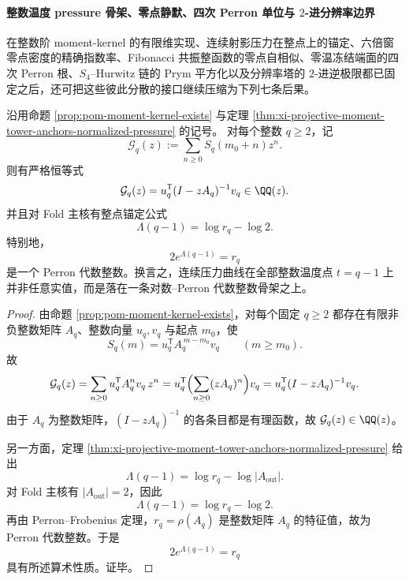 \paragraph{整数温度 pressure 骨架、零点静默、四次 Perron 单位与 \(2\)-进分辨率边界}
在整数阶 moment-kernel 的有限维实现、连续射影压力在整点上的锚定、六倍窗零点密度的精确指数率、Fibonacci 共振整函数的零点自相似、零温冻结端面的四次 Perron 根、\(S_4\)--Hurwitz 链的 Prym 平方化以及分辨率塔的 \(2\)-进逆极限都已固定之后，还可把这些彼此分散的接口继续压缩为下列七条后果。

\begin{theorem}[整数温度样本构成连续压力曲线的代数骨架]\label{thm:xi-time-part9zo-integer-temperature-pressure-algebraic-skeleton}
沿用命题 \ref{prop:pom-moment-kernel-exists} 与定理 \ref{thm:xi-projective-moment-tower-anchors-normalized-pressure} 的记号。
对每个整数 \(q\ge 2\)，记
\[
\mathcal G_q(z):=\sum_{n\ge 0}S_q(m_0+n)z^n.
\]
则有严格恒等式
\[
\mathcal G_q(z)=u_q^{\mathsf T}(I-zA_q)^{-1}v_q\in \QQ(z).
\]
并且对 Fold 主核有整点锚定公式
\[
\Lambda(q-1)=\log r_q-\log 2.
\]
特别地，
\[
2e^{\Lambda(q-1)}=r_q
\]
是一个 Perron 代数整数。换言之，连续压力曲线在全部整数温度点 \(t=q-1\) 上并非任意实值，而是落在一条对数--Perron 代数整数骨架之上。
\end{theorem}
\begin{proof}
由命题 \ref{prop:pom-moment-kernel-exists}，对每个固定 \(q\ge 2\) 都存在有限非负整数矩阵 \(A_q\)、整数向量 \(u_q,v_q\) 与起点 \(m_0\)，使
\[
S_q(m)=u_q^{\mathsf T}A_q^{\,m-m_0}v_q
\qquad (m\ge m_0).
\]
故
\[
\mathcal G_q(z)
=
\sum_{n\ge 0}u_q^{\mathsf T}A_q^n v_q\,z^n
=
u_q^{\mathsf T}\Bigl(\sum_{n\ge 0}(zA_q)^n\Bigr)v_q
=
u_q^{\mathsf T}(I-zA_q)^{-1}v_q.
\]
由于 \(A_q\) 为整数矩阵，\((I-zA_q)^{-1}\) 的各条目都是有理函数，故 \(\mathcal G_q(z)\in \QQ(z)\)。

另一方面，定理 \ref{thm:xi-projective-moment-tower-anchors-normalized-pressure} 给出
\[
\Lambda(q-1)=\log r_q-\log |A_{\mathrm{out}}|.
\]
对 Fold 主核有 \(|A_{\mathrm{out}}|=2\)，因此
\[
\Lambda(q-1)=\log r_q-\log 2.
\]
再由 Perron--Frobenius 定理，\(r_q=\rho(A_q)\) 是整数矩阵 \(A_q\) 的特征值，故为 Perron 代数整数。于是
\[
2e^{\Lambda(q-1)}=r_q
\]
具有所述算术性质。证毕。
\end{proof}

